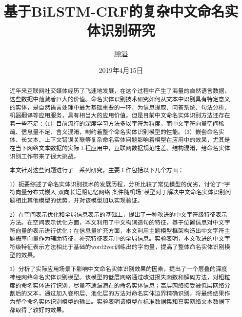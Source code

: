 \documentclass[winfonts,master,oneside,nobackinfo]{njuthesis}
\title{基于BiLSTM-CRF的复杂中文命名实体识别研究}
\author{顾溢}
\institute{南京大学}
\date{2019年4月15日}
\begin{document}

\maketitle
\makeenglishtitle



\begin{abstract}

近年来互联网社交媒体经历了飞速地发展，在这个过程中产生了海量的自然语言数据，这些数据中蕴藏着巨大的价值。命名实体识别技术研究如何从文本中识别具有特定意义的实体，是自然语言处理中最为基础重要的一环，为信息提取、问答系统、句法分析、机器翻译等应用服务，具有相当大的应用价值。但是目前中文命名实体识别方法还存在着一些不足：（1）目前流行的深度学习方法多以字符为粒度，而中文字符向量空间稀疏、信息量不足、含义混淆，制约着整个命名实体识别模型的性能。（2）嵌套命名实体、长文本、上下文错误关联等复杂命名实体问题影响着模型在应用中的效果，尤其是在当下网络文本数据的实际工程应用中，互联网数据规范性差、结构混淆，给命名实体识别工作带来了很大挑战。

本文针对这些问题进行了一系列研究，主要工作包括以下几个方面：

1）扼要综述了命名实体识别技术的发展历程，分析比较了常见模型的优劣，讨论了“字符向量分布式嵌入-双向长短期记忆网络-条件随机场”模型对于解决中文命名实体识别问题相比其他模型的优势，并对该模型加以实现验证。

2）在空间表示优化和全局信息表示的基础上，提出了一种改进的中文字符级特征表示方法。在空间表示优化方面，本文利用了中文构词造句的特征，基于位置信息对中文字符向量的表示进行优化；在信息量扩充方面，本文利用主题模型框架构造出中文字符主题概率向量作为辅助特征，补充特征表示中的全局信息。实验表明，本文改进的中文字符级特征表示方法相比于基础的word2vec训练出的字向量，提高了整体命名实体识别模型的效果。

3）分析了实际应用场景下影响中文命名实体识别效果的因素，提出了一个层叠的深度神经网络命名实体识别模型。该模型的低层网络通过改进损失函数和解码方法，对粗粒度的命名实体进行识别，尽量不遗漏潜在的命名实体信息；高层网络接受被低层网络分割后的文本，通过加入卷积层、池化层的方法对命名实体边界精确识别，将最终结果作为整个命名实体识别模型的输出。实验表明该模型在标准数据集和真实网络文本数据下都取得了较好的效果。


\end{abstract}
\end{document}
